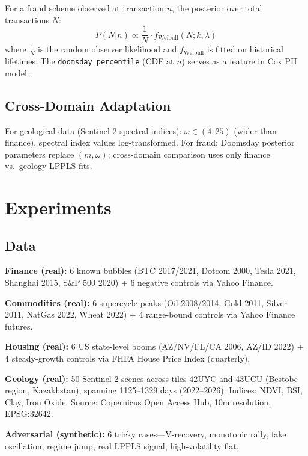 \documentclass[11pt,a4paper]{article}
\begin{document}
For a fraud scheme observed at transaction $n$, the posterior over total transactions $N$:
\begin{equation}
    P(N | n) \propto \frac{1}{N} \cdot f_{\text{Weibull}}(N; k, \lambda)
\end{equation}
where $\frac{1}{N}$ is the random observer likelihood \citep{gott1993} and $f_{\text{Weibull}}$ is fitted on historical lifetimes. The \texttt{doomsday\_percentile} (CDF at $n$) serves as a feature in Cox PH model \citep{cox1972}.

\subsection{Cross-Domain Adaptation}

For geological data (Sentinel-2 spectral indices): $\omega \in (4, 25)$ (wider than finance), spectral index values log-transformed. For fraud: Doomsday posterior parameters replace $(m, \omega)$; cross-domain comparison uses only finance vs.\ geology LPPLS fits.

\section{Experiments}

\subsection{Data}

\textbf{Finance (real):} 6 known bubbles (BTC 2017/2021, Dotcom 2000, Tesla 2021, Shanghai 2015, S\&P 500 2020) + 6 negative controls via Yahoo Finance.

\textbf{Commodities (real):} 6 supercycle peaks (Oil 2008/2014, Gold 2011, Silver 2011, NatGas 2022, Wheat 2022) + 4 range-bound controls via Yahoo Finance futures.

\textbf{Housing (real):} 6 US state-level booms (AZ/NV/FL/CA 2006, AZ/ID 2022) + 4 steady-growth controls via FHFA House Price Index (quarterly).

\textbf{Geology (real):} 50 Sentinel-2 scenes across tiles 42UYC and 43UCU (Bestobe region, Kazakhstan), spanning 1125--1329 days (2022--2026). Indices: NDVI, BSI, Clay, Iron Oxide. Source: Copernicus Open Access Hub, 10m resolution, EPSG:32642.

\textbf{Adversarial (synthetic):} 6 tricky cases---V-recovery, monotonic rally, fake oscillation, regime jump, real LPPLS signal, high-volatility flat.
\end{document}

